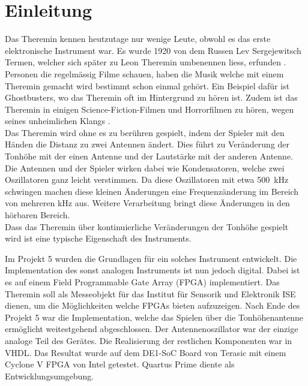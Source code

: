 \clearpage
\section{Einleitung}\label{sec:Einleitung}
Das Theremin kennen heutzutage nur wenige Leute, obwohl es das erste elektronische Instrument war. Es wurde 1920 von dem Russen Lev Sergejewitsch Termen, welcher sich später zu Leon Theremin umbenennen liess, erfunden \cite{Theremin_h}. Personen die regelmässig Filme schauen, haben die Musik welche mit einem Theremin gemacht wird bestimmt schon einmal gehört. Ein Beispiel dafür ist Ghostbusters, wo das Theremin oft im Hintergrund zu hören ist. Zudem ist das Theremin in einigen Science-Fiction-Filmen und Horrorfilmen zu hören, wegen seines unheimlichen Klangs \cite{Goast_m}.\\
Das Theremin wird ohne es zu berühren gespielt, indem der Spieler mit den Händen die Distanz zu zwei Antennen ändert. Dies führt zu Veränderung der Tonhöhe mit der einen Antenne und der Lautstärke mit der anderen Antenne. Die Antennen und der Spieler wirken dabei wie Kondensatoren, welche zwei Oszillatoren ganz leicht verstimmen. Da diese Oszillatoren mit etwa \SI{500}{kHz} schwingen machen diese kleinen Änderungen eine Frequenzänderung im Bereich von mehreren kHz aus. Weitere Verarbeitung bringt diese Änderungen in den hörbaren Bereich. \\
Dass das Theremin über kontinuierliche Veränderungen der Tonhöhe gespielt wird ist eine typische Eigenschaft des Instruments.

Im Projekt 5 wurden die Grundlagen für ein solches Instrument entwickelt. Die Implementation des sonst analogen Instruments ist nun jedoch digital. Dabei ist es auf einem Field Programmable Gate Array (FPGA) implementiert. Das Theremin soll als Messeobjekt für das Institut für Sensorik und Elektronik ISE dienen, um die Möglichkeiten welche FPGAs bieten aufzuzeigen. Nach Ende des Projekt 5 war die Implementation, welche das Spielen über die Tonhöhenantenne ermöglicht weitestgehend abgeschlossen. Der Antennenoszillator war der einzige analoge Teil des Gerätes. Die Realisierung der restlichen Komponenten war in VHDL. Das Resultat wurde auf dem DE1-SoC Board von Terasic mit einem Cyclone V FPGA von Intel getestet. Quartus Prime diente als Entwicklungsumgebung.

